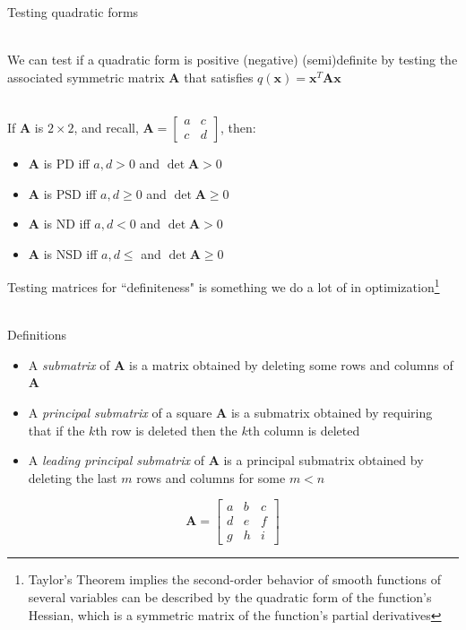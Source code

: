 \documentclass[10pt]{seminar}
\begin{document}
\begin{slide}
\newslide
Testing quadratic forms

\ \\We can test if a quadratic form is positive (negative) (semi)definite by testing the associated symmetric matrix $\mathbf{A}$ that satisfies $q(\mathbf{x})=\mathbf{x}^T\mathbf{A}\mathbf{x}$

\ \\If $\mathbf{A}$ is $2\times 2$, and recall, $\mathbf{A}=\begin{bmatrix}a& c\\c& d\end{bmatrix}$, then:

\begin{itemize}
\item $\mathbf{A}$ is PD iff $a, d>0$ and $\det \mathbf{A}>0$
\item $\mathbf{A}$ is PSD iff  $a, d\geq0$ and $\det \mathbf{A}\geq 0$
\item $\mathbf{A}$ is ND iff $a, d<0$ and $\det \mathbf{A}>0$
\item $\mathbf{A}$ is NSD iff  $a, d\leq $ and $\det \mathbf{A}\geq 0$
\end{itemize}

\newslide
Testing matrices for ``definiteness" is something we do a lot of in optimization\footnote{Taylor's Theorem implies the second-order behavior of smooth functions of several variables can be described by the quadratic form of the function's Hessian, which is a symmetric matrix of the function's partial derivatives}

\ \\Definitions

\begin{itemize}
\item A \textit{submatrix} of $\mathbf{A}$ is a matrix obtained by deleting some rows and columns of $\mathbf{A}$
\item A \textit{principal submatrix} of a square $\mathbf{A}$ is a submatrix obtained by requiring that if the $k$th row is deleted then the $k$th column is deleted
\item A \textit{leading principal submatrix} of  $\mathbf{A}$ is a principal submatrix obtained by deleting the last $m$ rows and columns for some $m<n$
\end{itemize}

\newslide

$$\mathbf{A}=\begin{bmatrix}
a& b& c\\
d& e& f\\
g& h& i
\end{bmatrix}$$


\end{slide}
\end{document}

